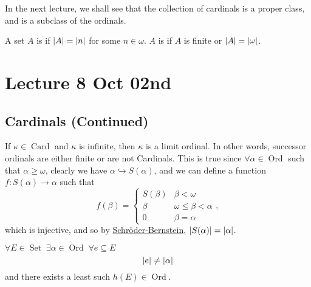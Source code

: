 \documentclass[notoc,notitlepage]{tufte-book}
\DeclareMathOperator{\Ord}{Ord }
\DeclareMathOperator{\Card}{Card }
\DeclareMathOperator{\Set}{Set }
\begin{document}
In the next lecture, we shall see that the collection of cardinals is a proper class, and is a subclass of the ordinals.

\begin{defn}
\label{defn:finite_n_countable}
  A set $A$ is  if $\left|A\right| = \left|n\right|$ for some $n \in \omega$. $A$ is  if $A$ is finite or $\left|A\right| = \left|\omega\right|$.
\end{defn}



\chapter{Lecture 8 Oct 02nd}%
\label{chp:lecture_8_oct_02nd}

\section{Cardinals (Continued)}%
\label{sec:cardinals_continued}

\begin{note}
  If $\kappa \in \Card$ and $\kappa$ is infinite, then $\kappa$ is a limit ordinal. In other words, successor ordinals are either finite or are not Cardinals. This is true since $\forall \alpha \in \Ord$ such that $\alpha \geq \omega$, clearly we have $\alpha \hookrightarrow S(\alpha)$, and we can define a function $f : S(\alpha) \to \alpha$ such that
  \begin{equation*}
    f(\beta) = \begin{cases}
      S(\beta) & \beta < \omega \\
      \beta    & \omega \leq \beta < \alpha \\
      0        & \beta = \alpha
    \end{cases},
  \end{equation*}
  which is injective, and so by \hyperref[lemma:schroder_bernstein_theorem]{Schr\"{o}der-Bernstein}, $\left|S(\alpha)\right| = \left|\alpha\right|$.
\end{note}

\begin{propo}
\label{propo:the_least_cardinality_not_equinumerous_to_subsets_of_a_set}
  $\forall E \in \Set \; \exists \alpha \in \Ord \; \forall e \subseteq E$
  \begin{equation*}
    \left|e\right| \neq \left|\alpha\right|
  \end{equation*}
  and there exists a least such $h(E) \in \Ord$.
\end{propo}
\end{document}
